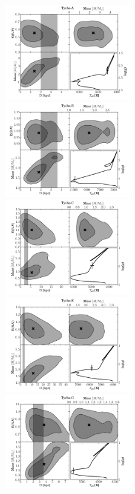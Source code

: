 \begin{figure}[htbp] %
   \includegraphics[width=0.5\textwidth]{chapter_sn1572_hires/plots/tycho-a-panel.pdf} 
   \includegraphics[width=0.5\textwidth]{chapter_sn1572_hires/plots/tycho-b-panel.pdf} 
   \includegraphics[width=0.5\textwidth]{chapter_sn1572_hires/plots/tycho-c-panel.pdf} 
   \includegraphics[width=0.5\textwidth]{chapter_sn1572_hires/plots/tycho-e-panel.pdf} 
   \includegraphics[width=0.5\textwidth]{chapter_sn1572_hires/plots/tycho-g-panel.pdf} 

\end{figure}
